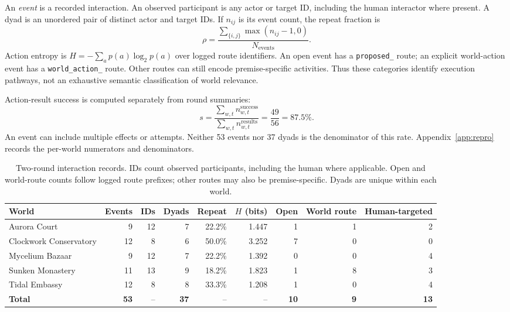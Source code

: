 An \emph{event} is a recorded interaction. An observed participant is any
actor or target ID, including the human interactor where present. A dyad is an
unordered pair of distinct actor and target IDs. If $n_{ij}$ is its event
count, the repeat fraction is
\begin{equation}
\rho=\frac{\sum_{\{i,j\}}\max(n_{ij}-1,0)}{N_{\mathrm{events}}}.
\end{equation}
Action entropy is $H=-\sum_a p(a)\log_2p(a)$ over logged route identifiers.
An open event has a \texttt{proposed\_} route; an explicit world-action event
has a \texttt{world\_action\_} route. Other routes can still encode
premise-specific activities. Thus these categories identify execution
pathways, not an exhaustive semantic classification of world relevance.

Action-result success is computed separately from round summaries:
\begin{equation}
s=\frac{\sum_{w,t}n^{\mathrm{success}}_{w,t}}
{\sum_{w,t}n^{\mathrm{results}}_{w,t}}=\frac{49}{56}=87.5\%.
\end{equation}
An event can include multiple effects or attempts. Neither 53 events nor
37 dyads is the denominator of this rate. Appendix~\ref{app:repro} records the
per-world numerators and denominators.

\begin{table}[t]
\centering\small
\setlength{\tabcolsep}{5pt}
\begin{tabularx}{\textwidth}{@{}Yrrrrrrrr@{}}
\toprule
World & Events & IDs & Dyads & Repeat & $H$ (bits) & Open & World route & Human-targeted \\
\midrule
Aurora Court & 9 & 12 & 7 & 22.2\% & 1.447 & 1 & 1 & 2 \\
Clockwork Conservatory & 12 & 8 & 6 & 50.0\% & 3.252 & 7 & 0 & 0 \\
Mycelium Bazaar & 9 & 12 & 7 & 22.2\% & 1.392 & 0 & 0 & 4 \\
Sunken Monastery & 11 & 13 & 9 & 18.2\% & 1.823 & 1 & 8 & 3 \\
Tidal Embassy & 12 & 8 & 8 & 33.3\% & 1.208 & 1 & 0 & 4 \\
\midrule
\textbf{Total} & \textbf{53} & -- & \textbf{37} & -- & -- & \textbf{10} & \textbf{9} & \textbf{13} \\
\bottomrule
\end{tabularx}
\caption{Two-round interaction records. IDs count observed participants,
including the human where applicable. Open and world-route counts follow
logged route prefixes; other routes may also be premise-specific. Dyads are
unique within each world.}
\label{tab:multiworld}
\end{table}

